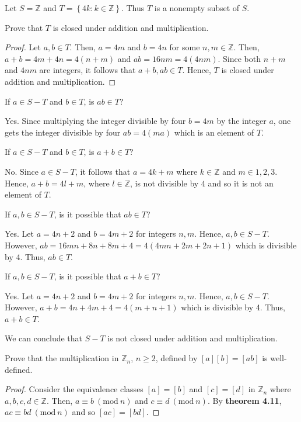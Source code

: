 \documentclass[12pt]{article}
\newcommand{\Z}{\mathbb{Z}}
\newcommand{\Mod}[1]{\ (\mathrm{mod}\ #1)}
\newenvironment{problem}[2][Problem]{\begin{trivlist} \item[\hskip \labelsep {\bfseries #1}\hskip \labelsep {\bfseries #2.}]}{\end{trivlist}}
\newenvironment{solution}[2][Solution]{\begin{trivlist} \item[\hskip \labelsep {\bfseries #1}\hskip \labelsep {\bfseries #2.}]}{\end{trivlist}}
\begin{document}
   \begin{problem}{57}
     Let $S=\Z$ and $T=\left\{ 4k:k\in\Z \right\}$. Thus $T$ is a nonempty subset of $S$.
     \begin{enumerate}[label=(\alph*)]
       \item Prove that $T$ is closed under addition and multiplication.
	 \begin{proof}
	   Let $a,b\in T$. Then, $a=4m$ and $b=4n$ for some $n,m\in \Z$. Then, $a+b = 4m+4n=4(n+m)$ and $ab = 16nm= 4(4nm)$. Since both $n+m$ and $4nm$ are integers, it follows that $a+b,ab\in T$. Hence, $T$ is closed under addition and multiplication.
	 \end{proof}
	\item If $a\in S-T$ and $b\in T$, is $ab\in T$?
	  \begin{solution}{(b)}
	    Yes. Since multiplying the integer divisible by four $b=4m$ by the integer $a$, one gets the integer divisible by four $ab=4(ma)$ which is an element of $T$.
	  \end{solution}
	\item If $a\in S-T$ and $b\in T$, is $a+b\in T$?
	  \begin{solution}{(c)}
	    No. Since $a\in S-T$, it follows that $a=4k+m$ where $k\in\Z$ and $m\in{1,2,3}$. Hence, $a+b=4l+m$, where $l\in \Z$, is not divisible by $4$ and so it is not an element of $T$.
	  \end{solution}
	\item If $a,b\in S-T$, is it possible that $ab \in T$?
	  \begin{solution}{(d)}
	    Yes. Let $a=4n+2$ and $b=4m+2$ for integers $n,m$. Hence, $a,b\in S-T$. However, $ab = 16mn + 8n + 8m +4 = 4(4mn+2m+2n+1)$ which is divisible by 4. Thus, $ab\in T$. 
	  \end{solution}
	 \item If $a,b\in S-T$, is it possible that $a+b\in T$?
	   \begin{solution}{(e)}
	     Yes. Let $a=4n+2$ and $b=4m+2$ for integers $n,m$. Hence, $a,b\in S-T$. However, $a+b = 4n+4m+4 = 4(m+n+1)$ which is divisible by 4. Thus, $a+b\in T$.
	   \end{solution}
We can conclude that $S-T$ is not closed under addition and multiplication.
     \end{enumerate}
   \end{problem}

   \begin{problem}{58}
     Prove that the multiplication in $\Z_{n}$, $n\geq 2$, defined by $[a][b]=[ab]$ is well-defined.
     \begin{proof}
       Consider the equivalence classes $[a]=[b]$ and $[c]=[d]$ in $\Z_{n}$ where $a,b,c,d\in \Z$. Then, $a\equiv b \Mod n$ and $c\equiv d \Mod n$. By \textbf{theorem 4.11}, $ac \equiv bd \Mod n$ and so $[ac]=[bd]$.
     \end{proof}
   \end{problem}
    
\end{document}
